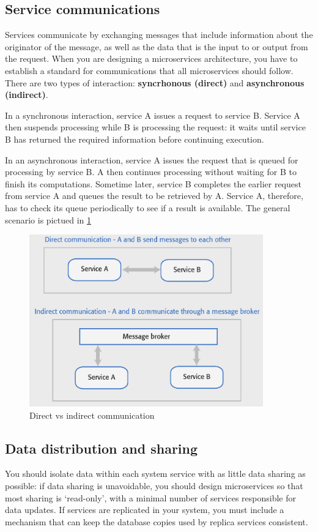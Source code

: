 \documentclass[10pt,a4paper]{report}
\begin{document}
\subsection{Service communications}
Services communicate by exchanging messages that include information about the originator of the message, as well as the data that is the input to or output from the request. When you are designing a microservices architecture, you have to establish a standard for communications that all microservices should follow.
There are two types of interaction: \textbf{syncrhonous (direct)} and \textbf{asynchronous (indirect)}.

In a synchronous interaction, service A issues a request to service B. Service A then suspends processing while B is processing the request: it waits until service B has returned the required information before continuing execution.

In an asynchronous interaction, service A issues the request that is queued for processing by service B. A then continues processing without waiting for B to finish its computations. Sometime later, service B completes the earlier request from service A and queues the result to be retrieved by A. Service A, therefore, has to check its queue periodically to see if a result is available. The general scenario is pictued in \ref{image61}
\begin{figure}[h]
	\centering
	\includegraphics[width=0.9\textwidth]{image61}
	\caption{Direct vs indirect communication}
	\label{image61}
\end{figure} 


\subsection{Data distribution and sharing}
You should isolate data within each system service with as little data
sharing as possible: if data sharing is unavoidable, you should design microservices so that most sharing is ‘read-only’, with a minimal number of services responsible for data updates.
If services are replicated in your system, you must include a mechanism that can keep the database copies used by replica services consistent.
\end{document}
